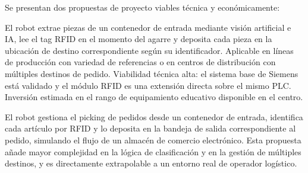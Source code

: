 Se presentan dos propuestas de proyecto viables técnica y económicamente:

El robot extrae piezas de un contenedor de entrada
mediante visión artificial e IA, lee el tag RFID en el momento del agarre y deposita cada pieza en la ubicación de destino
correspondiente según su identificador. Aplicable en líneas de producción con variedad de referencias o en centros de distribución
con múltiples destinos de pedido. Viabilidad técnica alta: el sistema base de Siemens está validado y el módulo RFID es una extensión
directa sobre el mismo PLC. Inversión estimada en el rango de equipamiento educativo disponible en el centro.


El robot gestiona el picking de pedidos desde un contenedor de entrada,
identifica cada artículo por RFID y lo deposita en la bandeja de salida correspondiente al pedido, simulando el flujo
de un almacén de comercio electrónico. Esta propuesta añade mayor complejidad en la lógica de clasificación y en la gestión
de múltiples destinos, y es directamente extrapolable a un entorno real de operador logístico.
